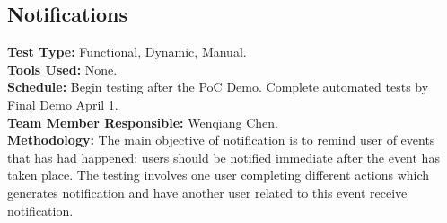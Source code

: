 \documentclass[12pt]{article}
\begin{document}
\subsection{Notifications}
\textbf{Test Type:} Functional, Dynamic, Manual. \\
\textbf{Tools Used:} None. \\
\textbf{Schedule:} Begin testing after the PoC Demo. Complete automated tests by Final Demo April 1. \\
\textbf{Team Member Responsible:} Wenqiang Chen. \\
\textbf{Methodology:} The main objective of notification is to remind user of events that has had happened; users should be notified immediate after the event has taken place. The testing involves one user completing different actions which generates notification and have another user related to this event receive notification.
\end{document}
